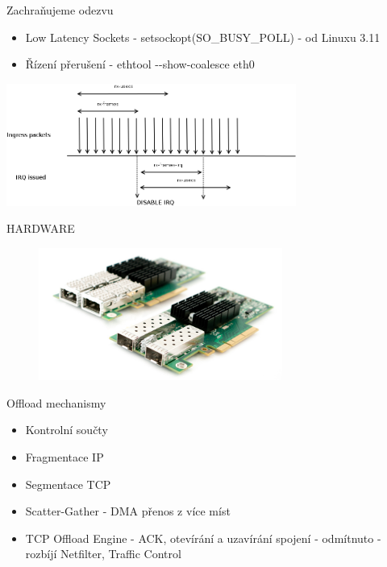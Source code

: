 \documentclass{beamer}
\begin{document}
\begin{frame}{Zachraňujeme odezvu}
	\begin{itemize}
		\item Low Latency Sockets - setsockopt(SO\_BUSY\_POLL) - od Linuxu 3.11
		\item Řízení přerušení - ethtool -{}-show-coalesce eth0
	\end{itemize}
	\centering
	\includegraphics[width=9.5cm,keepaspectratio]{fig/irq-napi.png}
\end{frame}


\begin{frame}{HARDWARE}
		\begin{figure}
			\centering
			\includegraphics[width=8cm,keepaspectratio]{fig/nic.jpg}
		\end{figure}
\end{frame}

\begin{frame}{Offload mechanismy}
	\begin{itemize}
		\item Kontrolní součty
		\item Fragmentace IP
		\item Segmentace TCP
		\item Scatter-Gather - DMA přenos z více míst
		\item TCP Offload Engine - ACK, otevírání a uzavírání spojení - odmítnuto - rozbíjí Netfilter, Traffic Control
	\end{itemize}
\end{frame}
\end{document}
